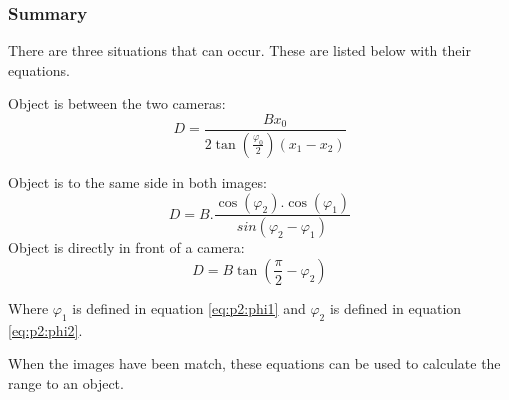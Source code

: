 \subsubsection{Summary}
There are three situations that can occur. These are listed below with their equations.

Object is between the two cameras:
\begin{equation} \label{eq:summary:1}
D = \frac{Bx_0}{2\tan(\frac{\varphi_0}{2})(x_1 - x_2)}
\end{equation}

Object is to the same side in both images:
\begin{equation} \label{eq:summary:2}
D = B.\frac{\cos(\varphi_2).\cos(\varphi_1)}{sin(\varphi_2 - \varphi_1)}
\end{equation}
Object is directly in front of a camera:
\begin{equation} \label{eq:summary:3}
D = B \tan(\frac{\pi}{2} - \varphi_{2})
\end{equation}

Where $\varphi_1$ is defined in equation \eqref{eq:p2:phi1} and $\varphi_2$ is defined in equation \eqref{eq:p2:phi2}.

When the images have been match, these equations can be used to calculate the range to an object.